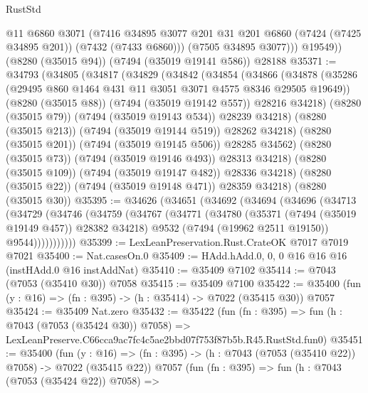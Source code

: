 \begin{lexlean}{RustStd}
\begin{coremodule}
            @11
            @6860
            @3071
            (@7416
              @34895
              @3077
              @201
              @31
              @201
              @6860
              (@7424 (@7425 @34895 @201))
              (@7432 (@7433 @6860)))
            (@7505 @34895 @3077)))
        @19549))
    (@8280 (@35015 @94))
    (@7494 (@35019 @19141 @586))
    @28188
@35371 := @34793
    (@34805
      (@34817
        (@34829
          (@34842
            (@34854
              (@34866
                (@34878
                  (@35286 (@29495 @860 @1464 @431 @11 @3051 @3071 @4575 @8346 @29505 @19649))
                  (@8280 (@35015 @88))
                  (@7494 (@35019 @19142 @557))
                  @28216
                  @34218)
                (@8280 (@35015 @79))
                (@7494 (@35019 @19143 @534))
                @28239
                @34218)
              (@8280 (@35015 @213))
              (@7494 (@35019 @19144 @519))
              @28262
              @34218)
            (@8280 (@35015 @201))
            (@7494 (@35019 @19145 @506))
            @28285
            @34562)
          (@8280 (@35015 @73))
          (@7494 (@35019 @19146 @493))
          @28313
          @34218)
        (@8280 (@35015 @109))
        (@7494 (@35019 @19147 @482))
        @28336
        @34218)
      (@8280 (@35015 @22))
      (@7494 (@35019 @19148 @471))
      @28359
      @34218)
    (@8280 (@35015 @30))
@35395 := @34626
    (@34651
      (@34692
        (@34694
          (@34696
            (@34713
              (@34729
                (@34746
                  (@34759
                    (@34767
                      (@34771
                        (@34780
                          (@35371 (@7494 (@35019 @19149 @457)) @28382 @34218)
                          @9532
                          (@7494 (@19962 @2511 @19150))
                          @9544)))))))))))
@35399 := LexLeanPreservation.Rust.CrateOK @7017 @7019 @7021
@35400 := Nat.casesOn.{0}
@35409 := HAdd.hAdd.{0, 0, 0} @16 @16 @16 (instHAdd.{0} @16 instAddNat)
@35410 := @35409 @7102
@35414 := @7043 (@7053 (@35410 @30)) @7058
@35415 := @35409 @7100
@35422 := @35400 (fun (y : @16) => (fn : @395) -> (h : @35414) -> @7022 (@35415 @30)) @7057
@35424 := @35409 Nat.zero
@35432 := @35422
    (fun (fn : @395) =>
    fun (h : @7043 (@7053 (@35424 @30)) @7058) =>
    LexLeanPreserve.C66cca9ac7fc4c5ae2bbd07f753f87b5b.R45.RustStd.fun0)
@35451 := @35400
    (fun (y : @16) => (fn : @395) -> (h : @7043 (@7053 (@35410 @22)) @7058) -> @7022 (@35415 @22))
    @7057
    (fun (fn : @395) =>
    fun (h : @7043 (@7053 (@35424 @22)) @7058) =>

\end{coremodule}
\end{lexlean}
